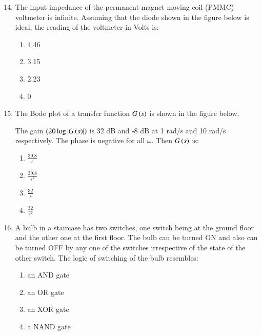 \documentclass[journal,9pt,onecolumn]{IEEEtran}
\begin{document}
\begin{enumerate}
\setcounter{enumi}{13}
\item The input impedance of the permanent magnet moving coil (PMMC) voltmeter is infinite. Assuming that the diode shown in the figure below is ideal, the reading of the voltmeter in Volts is:
\begin{center}
    
\end{center}
\begin{multicols}{4}
    \begin{enumerate}
        \item 4.46
        \item 3.15
        \item 2.23
        \item 0
    \end{enumerate}
\end{multicols}

\item The Bode plot of a transfer function $G\left(s\right)$ is shown in the figure below.
\begin{center}
    
\end{center}The gain $\left(20 \log \left\vert G\left(s\right)\right\vert\right)$ is 32 dB and -8 dB at 1 rad/s and 10 rad/s respectively. The phase is negative for all $\omega$. Then $G\left(s\right)$ is:

\begin{multicols}{4}
    \begin{enumerate}
        \item $\frac{39.8}{s}$
        \item $\frac{39.8}{s^2}$
        \item $\frac{32}{s}$
        \item $\frac{32}{s^2}$
    \end{enumerate}
\end{multicols}

\item A bulb in a staircase has two switches, one switch being at the ground floor and the other one at the first floor. The bulb can be turned ON and also can be turned OFF by any one of the switches irrespective of the state of the other switch. The logic of switching of the bulb resembles:

\begin{multicols}{4}
    \begin{enumerate}
        \item an AND gate
        \item an OR gate
        \item an XOR gate
        \item a NAND gate
    \end{enumerate}
\end{multicols}


\end{enumerate}
\end{document}
